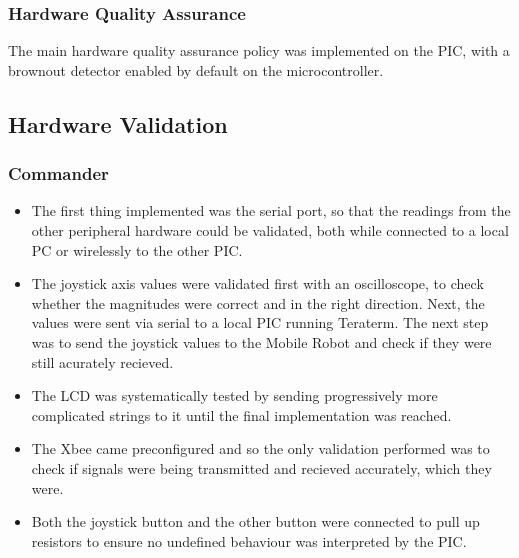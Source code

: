 \documentclass[11pt,a4paper]{article}
\begin{document}
    \subsubsection{Hardware Quality Assurance}
      The main hardware quality assurance policy was implemented on the PIC, with a brownout detector enabled by default on the microcontroller.\\

  \subsection{Hardware Validation}

    \subsubsection{Commander}
    \begin{itemize}
      \item The first thing implemented was the serial port, so that the readings from the other peripheral hardware could be validated, both while connected to a local PC or wirelessly to the other PIC.
      \item The joystick axis values were validated first with an oscilloscope, to check whether the magnitudes were correct and in the right direction. Next, the values were sent via serial to a local PIC running Teraterm. The next step was to send the joystick values to the Mobile Robot and check if they were still acurately recieved.
      \item The LCD was systematically tested by sending progressively more complicated strings to it until the final implementation was reached.
      \item The Xbee came preconfigured and so the only validation performed was to check if signals were being transmitted and recieved accurately, which they were.
      \item Both the joystick button and the other button were connected to pull up resistors to ensure no undefined behaviour was interpreted by the PIC.
    \end{itemize}
\end{document}
